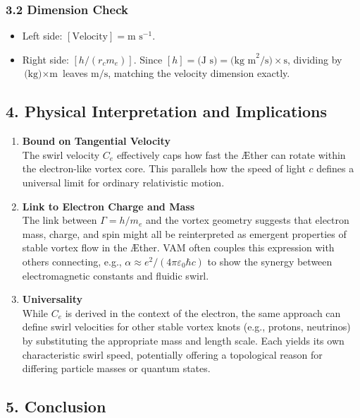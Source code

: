 \subsubsection*{3.2 Dimension Check}

\begin{itemize}
    \item Left side: \([\text{Velocity}] = \text{m s}^{-1}\).
    \item Right side: \([h/(r_c m_e)]\). Since \([h] = \text{(J s)} = \text{(kg m}^2\text{/s)}\times\text{s}\), dividing by \(\text{(kg)} \times \text{m}\) leaves \(\text{m}/\text{s}\), matching the velocity dimension exactly.
\end{itemize}

\subsection*{4. Physical Interpretation and Implications}

\begin{enumerate}
    \item \textbf{Bound on Tangential Velocity} \\
    The swirl velocity \(C_e\) effectively caps how fast the Æther can rotate within the electron-like vortex core. This parallels how the speed of light \(c\) defines a universal limit for ordinary relativistic motion.
    \item \textbf{Link to Electron Charge and Mass} \\
    The link between \(\Gamma = h/m_e\) and the vortex geometry suggests that electron mass, charge, and spin might all be reinterpreted as emergent properties of stable vortex flow in the Æther. VAM often couples this expression with others connecting, e.g., \(\alpha\approx e^2/(4\pi\varepsilon_0\hbar c)\) to show the synergy between electromagnetic constants and fluidic swirl.
    \item \textbf{Universality} \\
    While \(C_e\) is derived in the context of the electron, the same approach can define swirl velocities for other stable vortex knots (e.g., protons, neutrinos) by substituting the appropriate mass and length scale. Each yields its own characteristic swirl speed, potentially offering a topological reason for differing particle masses or quantum states.
\end{enumerate}

\subsection*{5. Conclusion}

